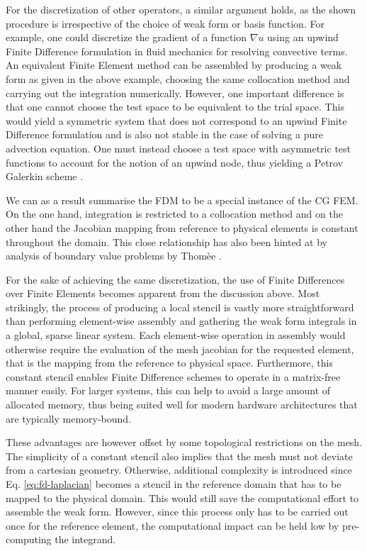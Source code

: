 \documentclass[asi,article,submit,moreauthors]{Definitions/mdpi}
\begin{document}
For the discretization of other operators, a similar argument holds, as the shown procedure is irrespective of the choice of weak form or basis function.
For example, one could discretize the gradient of a function $\nabla u$ using an upwind Finite Difference formulation in fluid mechanics for resolving convective terms.
An equivalent Finite Element method can be assembled by producing a weak form as given in the above example, choosing the same collocation method and carrying out the integration numerically.
However, one important difference is that one cannot choose the test space to be equivalent to the trial space.
This would yield a symmetric system that does not correspond to an upwind Finite Difference formulation and is also not stable in the case of solving a pure advection equation.
One must instead choose a test space with asymmetric test functions to account for the notion of an upwind node, thus yielding a Petrov Galerkin scheme \cite{brooksStreamlineUpwindPetrovGalerkin1982}.

We can as a result summarise the FDM to be a special instance of the CG FEM.
On the one hand, integration is restricted to a collocation method and on the other hand the Jacobian mapping from reference to physical elements is constant throughout the domain.
This close relationship has also been hinted at by analysis of boundary value problems by Thomèe \cite{thomeeFiniteDifferenceFinite1984}.

For the sake of achieving the same discretization, the use of Finite Differences over Finite Elements becomes apparent from the discussion above.
Most strikingly, the process of producing a local stencil is vastly more straightforward than performing element-wise assembly and gathering the weak form integrals in a global, sparse linear system.
Each element-wise operation in assembly would otherwise require the evaluation of the mesh jacobian for the requested element, that is the mapping from the reference to physical space.
Furthermore, this constant stencil enables Finite Difference schemes to operate in a matrix-free manner easily.
For larger systems, this can help to avoid a large amount of allocated memory, thus being suited well for modern hardware architectures that are typically memory-bound.

These advantages are however offset by some topological restrictions on the mesh.
The simplicity of a constant stencil also implies that the mesh must not deviate from a cartesian geometry.
Otherwise, additional complexity is introduced since Eq. \ref{eq:fd-laplacian} becomes a stencil in the reference domain that has to be mapped to the physical domain.
This would still save the computational effort to assemble the weak form.
However, since this process only has to be carried out once for the reference element, the computational impact can be held low by pre-computing the integrand.
\end{document}
